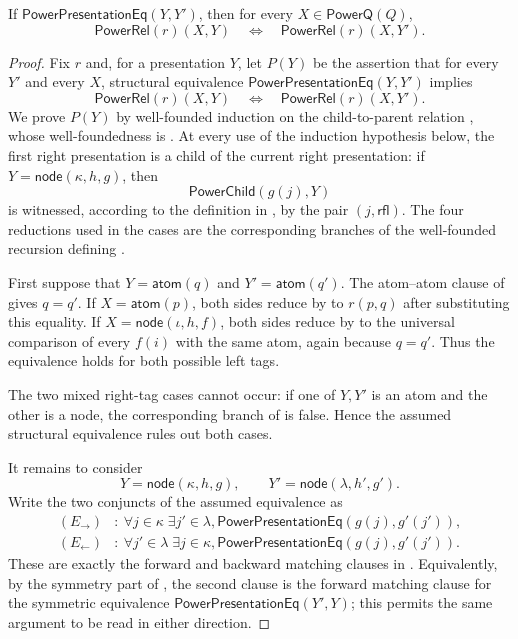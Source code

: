 \begin{lemma}
If $\mathsf{PowerPresentationEq}(Y,Y')$, then for every
$X\in\mathsf{PowerQ}(Q)$,
\[
\mathsf{PowerRel}(r)(X,Y)\quad\Longleftrightarrow\quad
\mathsf{PowerRel}(r)(X,Y').
\]
\end{lemma}
\begin{proof}
Fix $r$ and, for a presentation $Y$, let $P(Y)$ be the assertion that for
every $Y'$ and every $X$, structural equivalence
$\mathsf{PowerPresentationEq}(Y,Y')$ implies
\[
\mathsf{PowerRel}(r)(X,Y)\quad\Longleftrightarrow\quad
\mathsf{PowerRel}(r)(X,Y').
\]
We prove $P(Y)$ by well-founded induction on the child-to-parent relation
, whose well-foundedness is
.  At every use of the induction hypothesis
below, the first right presentation is a child of the current right
presentation: if $Y=\mathsf{node}(\kappa,h,g)$, then
\[
\mathsf{PowerChild}(g(j),Y)
\]
is witnessed, according to the definition in , by
the pair $(j,\mathsf{rfl})$.  The four reductions used in the cases are the
corresponding branches of the well-founded recursion defining
.

First suppose that $Y=\mathsf{atom}(q)$ and
$Y'=\mathsf{atom}(q')$.  The atom--atom clause of
 gives $q=q'$.  If
$X=\mathsf{atom}(p)$, both sides reduce by
 to $r(p,q)$ after substituting this equality.
If $X=\mathsf{node}(\iota,h,f)$, both sides reduce by
 to the universal comparison of every $f(i)$
with the same atom, again because $q=q'$.  Thus the equivalence holds for
both possible left tags.

The two mixed right-tag cases cannot occur: if one of $Y,Y'$ is an atom
and the other is a node, the corresponding branch of
 is false.  Hence the assumed structural
equivalence rules out both cases.

It remains to consider
\[
Y=\mathsf{node}(\kappa,h,g),\qquad
Y'=\mathsf{node}(\lambda,h',g').
\]
Write the two conjuncts of the assumed equivalence as
\[
\begin{split}
 (E_\to)&:\ \forall j\in\kappa\;\exists j'\in\lambda,
   \mathsf{PowerPresentationEq}(g(j),g'(j')),\\
 (E_\leftarrow)&:\ \forall j'\in\lambda\;\exists j\in\kappa,
   \mathsf{PowerPresentationEq}(g(j),g'(j')).
\end{split}
\]
These are exactly the forward and backward matching clauses in
.  Equivalently, by the symmetry part of
, the second clause is the forward
matching clause for the symmetric equivalence
$\mathsf{PowerPresentationEq}(Y',Y)$; this permits the same argument to be
read in either direction.


\end{proof}
